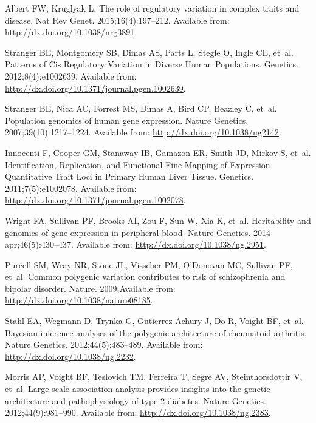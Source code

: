 \documentclass[10pt,letterpaper]{article}
\begin{document}
\begin{thebibliography}{10}
Albert FW, Kruglyak L.
\newblock The role of regulatory variation in complex traits and disease.
\newblock Nat Rev Genet. 2015;16(4):197--212.
\newblock Available from: \url{http://dx.doi.org/10.1038/nrg3891}.

Stranger BE, Montgomery SB, Dimas AS, Parts L, Stegle O, Ingle CE, et~al.
\newblock Patterns of Cis Regulatory Variation in Diverse Human Populations.
 Genetics. 2012;8(4):e1002639.
\newblock Available from: \url{http://dx.doi.org/10.1371/journal.pgen.1002639}.

Stranger BE, Nica AC, Forrest MS, Dimas A, Bird CP, Beazley C, et~al.
\newblock Population genomics of human gene expression.
\newblock Nature Genetics. 2007;39(10):1217--1224.
\newblock Available from: \url{http://dx.doi.org/10.1038/ng2142}.

Innocenti F, Cooper GM, Stanaway IB, Gamazon ER, Smith JD, Mirkov S, et~al.
\newblock Identification, Replication, and Functional Fine-Mapping of
  Expression Quantitative Trait Loci in Primary Human Liver Tissue.
 Genetics. 2011;7(5):e1002078.
\newblock Available from: \url{http://dx.doi.org/10.1371/journal.pgen.1002078}.

Wright FA, Sullivan PF, Brooks AI, Zou F, Sun W, Xia K, et~al.
\newblock Heritability and genomics of gene expression in peripheral blood.
\newblock Nature Genetics. 2014 apr;46(5):430--437.
\newblock Available from: \url{http://dx.doi.org/10.1038/ng.2951}.

Purcell SM, Wray NR, Stone JL, Visscher PM, O'Donovan MC, Sullivan PF, et~al.
\newblock Common polygenic variation contributes to risk of schizophrenia and
  bipolar disorder.
\newblock Nature. 2009;Available from:
  \url{http://dx.doi.org/10.1038/nature08185}.

Stahl EA, Wegmann D, Trynka G, Gutierrez-Achury J, Do R, Voight BF, et~al.
\newblock Bayesian inference analyses of the polygenic architecture of
  rheumatoid arthritis.
\newblock Nature Genetics. 2012;44(5):483--489.
\newblock Available from: \url{http://dx.doi.org/10.1038/ng.2232}.

Morris AP, Voight BF, Teslovich TM, Ferreira T, Segre AV, Steinthorsdottir
  V, et~al.
\newblock Large-scale association analysis provides insights into the genetic
  architecture and pathophysiology of type 2 diabetes.
\newblock Nature Genetics. 2012;44(9):981--990.
\newblock Available from: \url{http://dx.doi.org/10.1038/ng.2383}.


\end{thebibliography}
\end{document}

